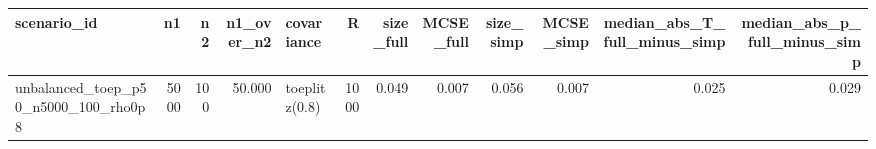 \begin{tabular}{lrrrlrrrrrrr}
\toprule
scenario\_id & n1 & n2 & n1\_over\_n2 & covariance & R & size\_full & MCSE\_full & size\_simp & MCSE\_simp & median\_abs\_T\_full\_minus\_simp & median\_abs\_p\_full\_minus\_simp \\
\midrule
unbalanced\_toep\_p50\_n5000\_100\_rho0p8 & 5000 & 100 & 50.000 & toeplitz(0.8) & 1000 & 0.049 & 0.007 & 0.056 & 0.007 & 0.025 & 0.029 \\
\bottomrule
\end{tabular}
